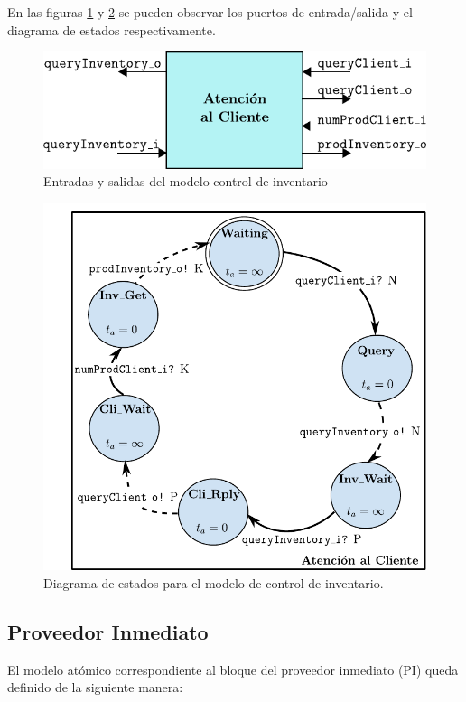 \documentclass[10pt]{article}
\begin{document}
En las figuras \ref{fig:AC-esquematico} y \ref{fig:AC-estados} se pueden observar los puertos de entrada/salida y el diagrama de estados respectivamente.

\begin{figure}[htbp]
	\centering
	\includegraphics{img/AC-esquematico}
	\caption{Entradas y salidas del modelo control de inventario}
	\label{fig:AC-esquematico}
\end{figure}

\begin{figure}[htbp]
	\centering
	\includegraphics{img/atencionClientedevsgraph}
	\caption{Diagrama de estados para el modelo de control de inventario.}
	\label{fig:AC-estados}
\end{figure}


\subsection{Proveedor Inmediato\label{sec:PI}}
El modelo atómico correspondiente al bloque del proveedor inmediato (PI) queda definido de la siguiente manera:
\end{document}
